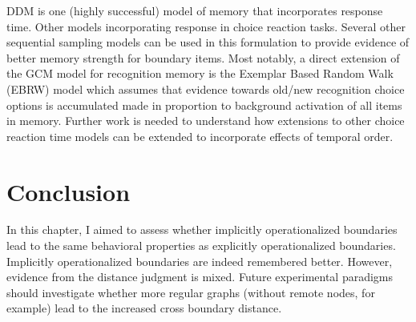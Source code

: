 DDM is one (highly successful) model of memory that incorporates response time. Other models incorporating response in choice reaction tasks. Several other sequential sampling models can be used in this formulation to provide evidence of better memory strength for boundary items. Most notably, a direct extension of the GCM model for recognition memory is the Exemplar Based Random Walk (EBRW) model \cite{nosofsky2011short} which assumes that evidence towards old/new recognition choice options is accumulated made in proportion to background activation of all items in memory. Further work is needed to understand how extensions to other choice reaction time models can be extended to incorporate effects of temporal order.

\section{Conclusion}
In this chapter, I aimed to assess whether implicitly operationalized boundaries lead to the same behavioral properties as explicitly operationalized boundaries. Implicitly operationalized boundaries are indeed remembered better. However, evidence from the distance judgment is mixed. Future experimental paradigms should investigate whether more regular graphs (without remote nodes, for example) lead to the increased cross boundary distance. 
